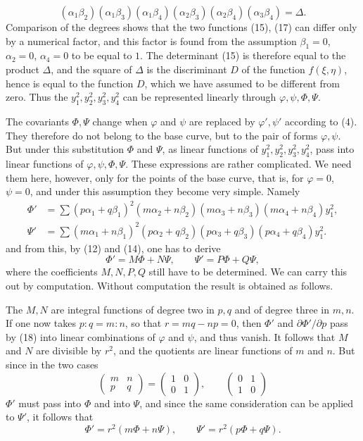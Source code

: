 \documentclass[11pt]{article}
\begin{document}
\begin{equation}
(\alpha_1\beta_2)(\alpha_1\beta_3)(\alpha_1\beta_4)(\alpha_2\beta_3)(\alpha_2\beta_4)(\alpha_3\beta_4)=\Delta.
\tag{17}
\end{equation}
Comparison of the degrees shows that the two functions (15), (17) can differ only by a numerical factor, and this factor is found from the assumption $\beta_1=0$, $\alpha_2=0$, $\alpha_4=0$ to be equal to $1$. The determinant (15) is therefore equal to the product $\Delta$, and the square of $\Delta$ is the discriminant $D$ of the function $f(\xi,\eta)$, hence is equal to the function $D$, which we have assumed to be different from zero. Thus the $y_1^2,y_2^2,y_3^2,y_4^2$ can be represented linearly through $\varphi,\psi,\Phi,\Psi$.

The covariants $\Phi,\Psi$ change when $\varphi$ and $\psi$ are replaced by $\varphi',\psi'$ according to (4). They therefore do not belong to the base curve, but to the pair of forms $\varphi,\psi$. But under this substitution $\Phi$ and $\Psi$, as linear functions of $y_1^2,y_2^2,y_3^2,y_4^2$, pass into linear functions of $\varphi,\psi,\Phi,\Psi$. These expressions are rather complicated. We need them here, however, only for the points of the base curve, that is, for $\varphi=0$, $\psi=0$, and under this assumption they become very simple. Namely
\begin{equation}
\begin{aligned}
\Phi'&=\sum (p\alpha_1+q\beta_1)^2(m\alpha_2+n\beta_2)(m\alpha_3+n\beta_3)(m\alpha_4+n\beta_4)y_1^2,\\
\Psi'&=\sum (m\alpha_1+n\beta_1)^2(p\alpha_2+q\beta_2)(p\alpha_3+q\beta_3)(p\alpha_4+q\beta_4)y_1^2.
\end{aligned}
\tag{18}
\end{equation}
and from this, by (12) and (14), one has to derive
\[
\Phi'=M\Phi+N\Psi,\qquad \Psi'=P\Phi+Q\Psi,
\]
where the coefficients $M,N,P,Q$ still have to be determined. We can carry this out by computation. Without computation the result is obtained as follows.

The $M,N$ are integral functions of degree two in $p,q$ and of degree three in $m,n$. If one now takes $p:q=m:n$, so that $r=mq-np=0$, then $\Phi'$ and $\partial\Phi'/\partial p$ pass by (18) into linear combinations of $\varphi$ and $\psi$, and thus vanish. It follows that $M$ and $N$ are divisible by $r^2$, and the quotients are linear functions of $m$ and $n$. But since in the two cases
\[
\begin{pmatrix}m&n\\ p&q\end{pmatrix}=
\begin{pmatrix}1&0\\ 0&1\end{pmatrix},
\qquad
\begin{pmatrix}0&1\\ 1&0\end{pmatrix}
\]
$\Phi'$ must pass into $\Phi$ and into $\Psi$, and since the same consideration can be applied to $\Psi'$, it follows that
\begin{equation}
\Phi'=r^2(m\Phi+n\Psi),\qquad
\Psi'=r^2(p\Phi+q\Psi).
\tag{19}
\end{equation}
\end{document}
